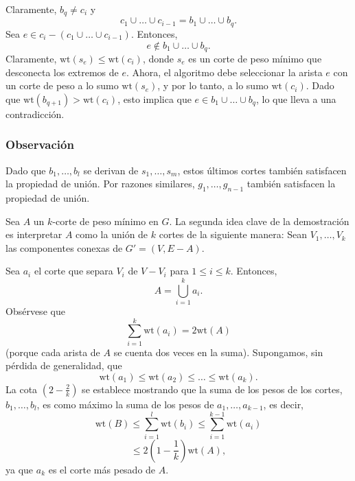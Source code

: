 \documentclass{article}
\begin{document}
Claramente, \( b_q \neq c_i \) y  
\[
c_1 \cup \dots \cup c_{i-1} = b_1 \cup \dots \cup b_q.
\]
Sea \( e \in c_i - (c_1 \cup \dots \cup c_{i-1}) \). Entonces,  
\[
e \notin b_1 \cup \dots \cup b_q.
\]
Claramente, \( \text{wt}(s_e) \leq \text{wt}(c_i) \), donde \( s_e \) es un corte de peso mínimo que desconecta los extremos de \( e \). Ahora, el algoritmo debe seleccionar la arista \( e \) con un corte de peso a lo sumo \( \text{wt}(s_e) \), y por lo tanto, a lo sumo \( \text{wt}(c_i) \). Dado que \( \text{wt}(b_{q+1}) > \text{wt}(c_i) \), esto implica que \( e \in b_1 \cup \dots \cup b_q \), lo que lleva a una contradicción.

\subsubsection*{Observación}
Dado que \( b_1, \dots, b_l \) se derivan de \( s_1, \dots, s_m \), estos últimos cortes también satisfacen la propiedad de unión. Por razones similares, \( g_1, \dots, g_{n-1} \) también satisfacen la propiedad de unión.

Sea \( A \) un \( k \)-corte de peso mínimo en \( G \). La segunda idea clave de la demostración es interpretar \( A \) como la unión de \( k \) cortes de la siguiente manera: Sean \( V_1, \dots, V_k \) las componentes conexas de \( G' = (V, E - A) \).  

Sea \( a_i \) el corte que separa \( V_i \) de \( V - V_i \) para \( 1 \leq i \leq k \). Entonces,
\[
A = \bigcup_{i=1}^{k} a_i.
\]
Obsérvese que  
\[
\sum_{i=1}^{k} \text{wt}(a_i) = 2\text{wt}(A)
\]
(porque cada arista de \( A \) se cuenta dos veces en la suma). Supongamos, sin pérdida de generalidad, que
\[
\text{wt}(a_1) \leq \text{wt}(a_2) \leq \dots \leq \text{wt}(a_k).
\]
La cota \( (2 - \frac{2}{k}) \) se establece mostrando que la suma de los pesos de los cortes, \( b_1, \dots, b_l \), es como máximo la suma de los pesos de \( a_1, \dots, a_{k-1} \), es decir,
\[
\text{wt}(B) \leq \sum_{i=1}^{l} \text{wt}(b_i) \leq \sum_{i=1}^{k-1} \text{wt}(a_i)
\]
\[
\leq 2(1 - \frac{1}{k})\text{wt}(A),
\]
ya que \( a_k \) es el corte más pesado de \( A \).
\end{document}
